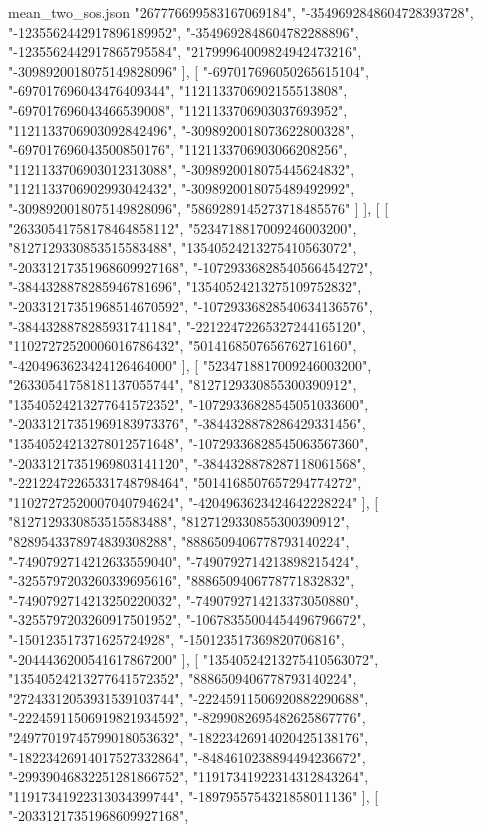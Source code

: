 \begin{filecontents*}[overwrite]{mean_two_sos.json}
    "267776699583167069184",
    "-3549692848604728393728",
    "-1235562442917896189952",
    "-3549692848604782288896",
    "-1235562442917865795584",
    "21799964009824942473216",
    "-3098920018075149828096"
   ],
   [
    "-697017696050265615104",
    "-697017696043476409344",
    "1121133706902155513808",
    "-697017696043466539008",
    "1121133706903037693952",
    "1121133706903092842496",
    "-3098920018073622800328",
    "-697017696043500850176",
    "1121133706903066208256",
    "1121133706903012313088",
    "-3098920018075445624832",
    "1121133706902993042432",
    "-3098920018075489492992",
    "-3098920018075149828096",
    "5869289145273718485576"
   ]
  ],
  [
   [
    "26330541758178464858112",
    "5234718817009246003200",
    "8127129330853515583488",
    "13540524213275410563072",
    "-20331217351968609927168",
    "-10729336828540566454272",
    "-3844328878285946781696",
    "13540524213275109752832",
    "-20331217351968514670592",
    "-10729336828540634136576",
    "-3844328878285931741184",
    "-22122472265327244165120",
    "11027272520006016786432",
    "5014168507656762716160",
    "-4204963623424126464000"
   ],
   [
    "5234718817009246003200",
    "26330541758181137055744",
    "8127129330855300390912",
    "13540524213277641572352",
    "-10729336828545051033600",
    "-20331217351969183973376",
    "-3844328878286429331456",
    "13540524213278012571648",
    "-10729336828545063567360",
    "-20331217351969803141120",
    "-3844328878287118061568",
    "-22122472265331748798464",
    "5014168507657294774272",
    "11027272520007040794624",
    "-4204963623424642228224"
   ],
   [
    "8127129330853515583488",
    "8127129330855300390912",
    "8289543378974839308288",
    "8886509406778793140224",
    "-7490792714212633559040",
    "-7490792714213898215424",
    "-3255797203260339695616",
    "8886509406778771832832",
    "-7490792714213250220032",
    "-7490792714213373050880",
    "-3255797203260917501952",
    "-10678355004454496796672",
    "-150123517371625724928",
    "-150123517369820706816",
    "-2044436200541617867200"
   ],
   [
    "13540524213275410563072",
    "13540524213277641572352",
    "8886509406778793140224",
    "27243312053931539103744",
    "-22245911506920882290688",
    "-22245911506919821934592",
    "-8299082695482625867776",
    "24977019745799018053632",
    "-18223426914020425138176",
    "-18223426914017527332864",
    "-8484610238894494236672",
    "-29939046832251281866752",
    "11917341922314312843264",
    "11917341922313034399744",
    "-1897955754321858011136"
   ],
   [
    "-20331217351968609927168",

\end{filecontents*}
